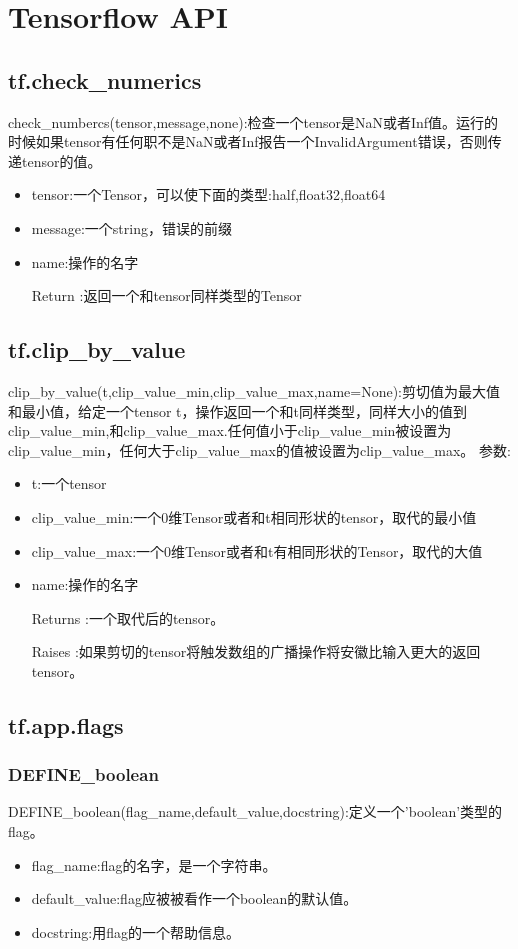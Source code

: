 \chapter{Tensorflow API}
\section{tf.check\_numerics}
check\_numbercs(tensor,message,none):检查一个tensor是NaN或者Inf值。运行的时候如果tensor有任何职不是NaN或者Inf报告一个InvalidArgument错误，否则传递tensor的值。
\begin{itemize}
	\item tensor:一个Tensor，可以使下面的类型:half,float32,float64
	\item message:一个string，错误的前缀
	\item name:操作的名字
	\item[Return]:返回一个和tensor同样类型的Tensor
\end{itemize}
\section{tf.clip\_by\_value}
clip\_by\_value(t,clip\_value\_min,clip\_value\_max,name=None):剪切值为最大值和最小值，给定一个tensor t，操作返回一个和t同样类型，同样大小的值到clip\_value\_min,和clip\_value\_max.任何值小于clip\_value\_min被设置为clip\_value\_min，任何大于clip\_value\_max的值被设置为clip\_value\_max。
参数:
\begin{itemize}
	\item t:一个tensor
	\item clip\_value\_min:一个0维Tensor或者和t相同形状的tensor，取代的最小值
	\item clip\_value\_max:一个0维Tensor或者和t有相同形状的Tensor，取代的大值
	\item name:操作的名字
	\item[Returns]:一个取代后的tensor。
	\item[Raises]:如果剪切的tensor将触发数组的广播操作将安徽比输入更大的返回tensor。
\end{itemize}
\section{tf.app.flags}
\subsection{DEFINE\_boolean}
DEFINE\_boolean(flag\_name,default\_value,docstring):定义一个'boolean'类型的flag。
\begin{itemize}
\item flag\_name:flag的名字，是一个字符串。
\item default\_value:flag应被被看作一个boolean的默认值。
\item docstring:用flag的一个帮助信息。
\end{itemize}
